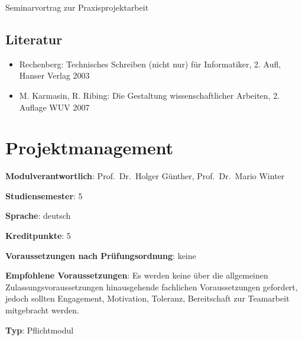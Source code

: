 Seminarvortrag zur Praxisprojektarbeit

\section*{Literatur\label{/mi-2017/modulbeschreibungen-bachelor/BA_Praxisprojektseminar}}\label{literaturpathlabelmi-2017modulbeschreibungen-bachelorbaux5fpraxisprojektseminar}

\begin{itemize}
\tightlist
\item
  Rechenberg: Technisches Schreiben (nicht nur) für Informatiker, 2.
  Aufl, Hanser Verlag 2003
\item
  M. Karmasin, R. Ribing: Die Gestaltung wissenschaftlicher Arbeiten, 2.
  Auflage WUV 2007
\end{itemize}

\chapter{Projektmanagement\label{/mi-2017/modulbeschreibungen-bachelor/BA_Projektmanagement}}\label{projektmanagementpathlabelmi-2017modulbeschreibungen-bachelorbaux5fprojektmanagement}

\begin{modulHead}
\textbf{Modulverantwortlich}: Prof.~Dr.~Holger
Günther, Prof.~Dr.~Mario
Winter
\end{modulHead}
\begin{modulHead}
\textbf{Studiensemester}:
5
\end{modulHead}
\begin{modulHead}
\textbf{Sprache}:
deutsch
\end{modulHead}
\begin{modulHead}
\textbf{Kreditpunkte}:
5
\end{modulHead}
\begin{modulHead}
\textbf{Voraussetzungen nach
Prüfungsordnung}:
keine
\end{modulHead}
\begin{modulHead}
\textbf{Empfohlene
Voraussetzungen}: Es werden keine über die allgemeinen
Zulassungsvoraussetzungen hinausgehende fachlichen Voraussetzungen
gefordert, jedoch sollten Engagement, Motivation, Toleranz, Bereitschaft
zur Teamarbeit mitgebracht
werden.
\end{modulHead}
\begin{modulHead}
\textbf{Typ}:
Pflichtmodul
\end{modulHead}


